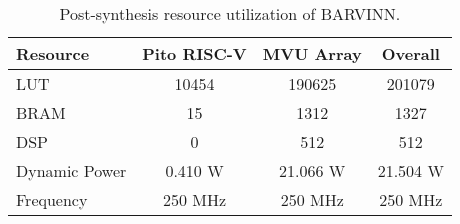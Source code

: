 \documentclass[sigconf]{acmart}
\newcommand{\MVU}{MVU}
\newcommand{\barvinn}{BARVINN}
\newcommand{\pito}{Pito}
\begin{document}

\begin{table}[]
\caption{Post-synthesis resource utilization of \barvinn{}.}
\begin{tabular}{|l|c|c|c|}
\hline
Resource    & \pito{} RISC-V     & \MVU{} Array       & Overall  \\ \hline\hline
LUT         & 10454    &  190625   &       201079    \\ \hline
BRAM      & 15       &    1312     &      1327      \\ \hline
DSP         &   0       & 512       &      512      \\ \hline
Dynamic Power          &  0.410 W    &   21.066 W  &      21.504 W      \\ \hline
Frequency          &  250 MHz    &   250 MHz  & 250 MHz    \\ \hline
\end{tabular}
\label{tab:fpga_impl}
\end{table}
\end{document}
